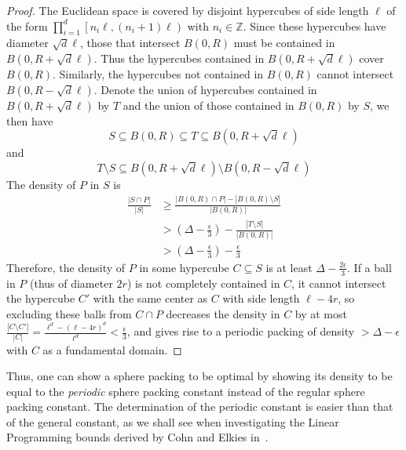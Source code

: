 \begin{proof}
  The Euclidean space is covered by disjoint hypercubes of side length $\ell$ of the form $\prod_{i=1}^d \left[ n_i\ell, (n_i+1)\ell \right)$ with $n_i \in \mathbb{Z}$. Since these hypercubes have diameter $\sqrt{d}\ell$, those that intersect $B(0,R)$ must be contained in $B(0,R+\sqrt{d}\ell)$. Thus the hypercubes contained in $B(0,R+\sqrt{d}\ell)$ cover $B(0,R)$. Similarly, the hypercubes not contained in $B(0,R)$ cannot intersect $B(0,R-\sqrt{d}\ell)$. Denote the union of hypercubes contained in $B(0,R+\sqrt{d}\ell)$ by $T$ and the union of those contained in $B(0,R)$ by $S$, we then have
  \[
    S \subseteq B(0,R) \subseteq T \subseteq B(0,R+\sqrt{d}\ell)
  \]
  and
  \[
    T \setminus S \subseteq B(0,R+\sqrt{d}\ell) \setminus B(0,R-\sqrt{d}\ell)
  \]
  The density of $P$ in $S$ is
  \[
    \begin{aligned}
      \frac{\left| S \cap P \right|}{\left| S \right|}
      &\ge \frac{\left| B(0,R) \cap P \right| - \left| B(0,R) \setminus S \right|}{\left| B(0,R) \right|} \\
      &> \left( \Delta - \frac{\epsilon}{3} \right) - \frac{\left| T \setminus S \right|}{\left| B(0,R) \right|} \\
      &> \left( \Delta - \frac{\epsilon}{3} \right) - \frac{\epsilon}{3}
    \end{aligned}
  \]
  Therefore, the density of $P$ in some hypercube $C \subseteq S$ is at least $\Delta - \frac{2\epsilon}{3}$. If a ball in $P$ (thus of diameter $2r$) is not completely contained in $C$, it cannot intersect the hypercube $C'$ with the same center as $C$ with side length $\ell-4r$, so excluding these balls from $C\cap P$ decreases the density in $C$ by at most $\frac{\left| C \setminus C' \right|}{\left| C \right|} = \frac{\ell^d - (\ell-4r)^d}{\ell^d} < \frac{\epsilon}{3}$, and gives rise to a periodic packing of density $> \Delta - \epsilon$ with $C$ as a fundamental domain.
\end{proof}

Thus, one can show a sphere packing to be optimal by showing its density to be equal to the \emph{periodic} sphere packing constant instead of the regular sphere packing constant. The determination of the periodic constant is easier than that of the general constant, as we shall see when investigating the Linear Programming bounds derived by Cohn and Elkies in~\cite{ElkiesCohn}.
